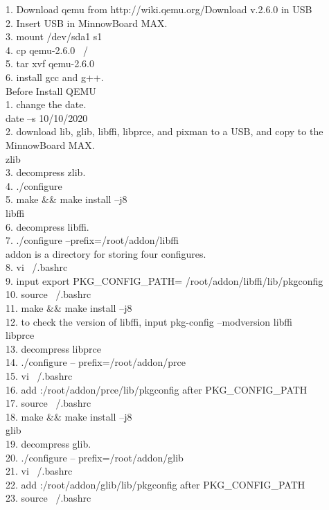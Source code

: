 \documentclass[11pt,draftclsnofoot,onecolumn,letterpaper]{IEEEtran}
\begin{document}
1.  Download qemu from http://wiki.qemu.org/Download v.2.6.0 in USB\\
2.  Insert USB in MinnowBoard MAX.\\
3.  mount /dev/sda1 s1\\
4.  cp qemu-2.6.0 ~/\\
5.  tar xvf qemu-2.6.0\\
6.  install gcc and g++.\\
Before Install QEMU\\
1.  change the date.\\
date –s 10/10/2020\\
2.  download lib, glib, libffi, libprce, and pixman to a USB, and copy to the MinnowBoard MAX.\\
zlib\\
3.  decompress zlib.\\
4.  ./configure\\
5.  make \&\& make install –j8\\
libffi\\
6.  decompress libffi.\\
7.  ./configure –prefix=/root/addon/libffi\\
addon is a directory for storing four configures.\\
8.  vi ~/.bashrc\\
9.  input export PKG\_CONFIG\_PATH= /root/addon/libffi/lib/pkgconfig\\
10. source ~/.bashrc\\
11. make \&\& make install –j8\\
12. to check the version of libffi, input pkg-config –modversion libffi\\
libprce\\
13. decompress libprce\\
14. ./configure -- prefix=/root/addon/prce\\
15. vi ~/.bashrc\\
16. add :/root/addon/prce/lib/pkgconfig after PKG\_CONFIG\_PATH\\
17. source ~/.bashrc\\
18. make \&\& make install –j8\\
glib\\
19. decompress glib.\\
20. ./configure -- prefix=/root/addon/glib\\
21. vi ~/.bashrc\\
22. add :/root/addon/glib/lib/pkgconfig after PKG\_CONFIG\_PATH\\
23. source ~/.bashrc\\
\end{document}
